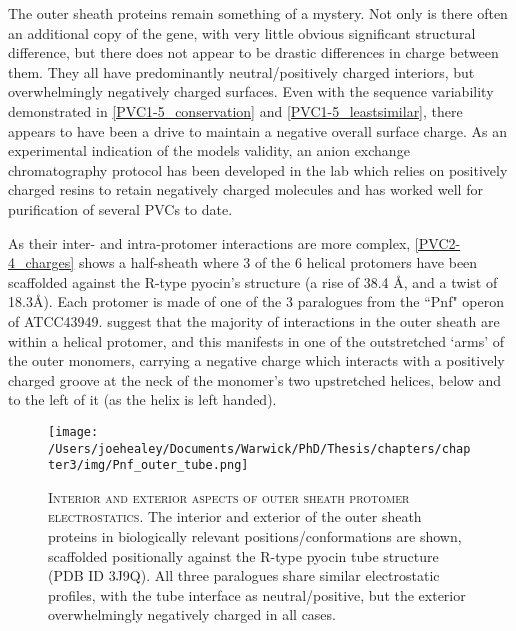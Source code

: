 The outer sheath proteins remain something of a mystery. Not only is there often an additional copy of the gene, with very little obvious significant structural difference, but there does not appear to be drastic differences in charge between them. They all have predominantly neutral/positively charged interiors, but overwhelmingly negatively charged surfaces. Even with the sequence variability demonstrated in \vref{PVC1-5_conservation} and \ref{PVC1-5_leastsimilar}, there appears to have been a drive to maintain a negative overall surface charge. As an experimental indication of the models validity, an anion exchange chromatography protocol has been developed in the lab which relies on positively charged resins to retain negatively charged molecules and has worked well for purification of several PVCs to date.

As their inter- and intra-protomer interactions are more complex, \vref{PVC2-4_charges} shows a half-sheath where 3 of the 6 helical protomers have been scaffolded against the R-type pyocin's structure (a rise of 38.4 \AA, and a twist of 18.3\AA). Each protomer is made of one of the 3 paralogues from the ``Pnf" operon of ATCC43949. \cite{Ge2015a} suggest that the majority of interactions in the outer sheath are within a helical protomer, and this manifests in one of the outstretched `arms' of the outer monomers, carrying a negative charge which interacts with a positively charged groove at the neck of the monomer's two upstretched helices, below and to the left of it (as the helix is left handed).

\begin{figure}[p]
 \centering
   \texttt{[image: /Users/joehealey/Documents/Warwick/PhD/Thesis/chapters/chapter3/img/Pnf\_outer\_tube.png]}
 \captionsetup{singlelinecheck=off, justification=justified, font=footnotesize, aboveskip=10pt}
 \caption[Electrostatic tube strata interfaces]{\textsc{\normalsize Interior and exterior aspects of outer sheath protomer electrostatics.}\vspace{0.1cm} \newline The interior and exterior of the outer sheath proteins in biologically relevant positions/conformations are shown, scaffolded positionally against the R-type pyocin tube structure (PDB ID 3J9Q). All three paralogues share similar electrostatic profiles, with the tube interface as neutral/positive, but the exterior overwhelmingly negatively charged in all cases.}
 \label{PVC2-4_charges}
\end{figure}

